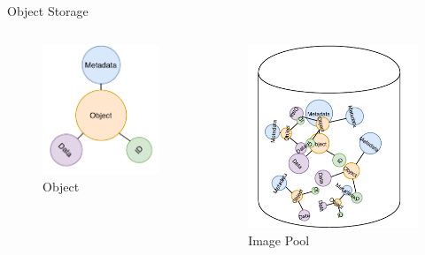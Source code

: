 \begin{frame}{Object Storage}
    \begin{columns}
    \begin{column}{0.47\textwidth}
    \begin{figure}
        \centering
        \includegraphics{img/object.pdf}
        \caption{Object}
        \label{fig:my_label}
    \end{figure}
    \end{column}
    \begin{column}{0.47\textwidth}
    \begin{figure}
        \centering
        \includegraphics[width=\textwidth,height=0.55\textheight,keepaspectratio]{img/pool.pdf}
        \caption{Image Pool}
        \label{fig:my_label}
    \end{figure}
    \end{column}
\end{columns}
\end{frame}
